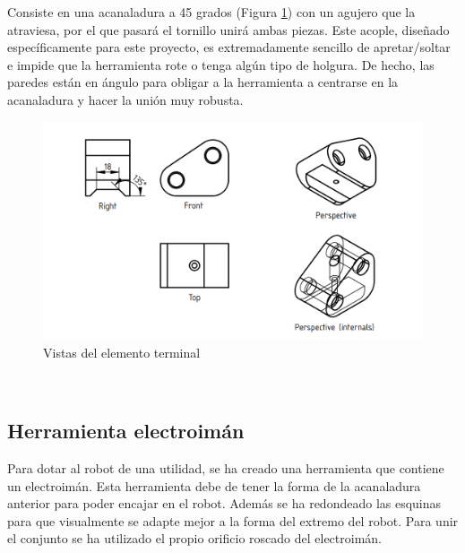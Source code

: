 Consiste en una acanaladura a 45 grados (Figura \ref{fig:vistas_extremo}) con un agujero que la atraviesa, por el que pasará el tornillo unirá ambas piezas. Este acople,
diseñado específicamente para este proyecto, es extremadamente sencillo de apretar/soltar e impide que la herramienta rote o 
tenga algún tipo de holgura. De hecho, las paredes están en ángulo para obligar a la herramienta a centrarse en la acanaladura y hacer 
la unión muy robusta.
\begin{figure} [ht!]
  \begin{center}
    \includegraphics[width=15cm]{figs/vistas_extremo.png}
  \end{center}
  \caption{Vistas del elemento terminal}
  \label{fig:vistas_extremo}
\end{figure}\ 

\subsection{Herramienta electroimán}
\noindent Para dotar al robot de una utilidad, se ha creado una herramienta que contiene un electroimán. Esta herramienta debe de tener la forma 
de la acanaladura anterior para poder encajar en el robot. Además se ha redondeado las esquinas para que visualmente se adapte mejor a la 
forma del extremo del robot. Para unir el conjunto se ha utilizado el propio orificio roscado del electroimán.
